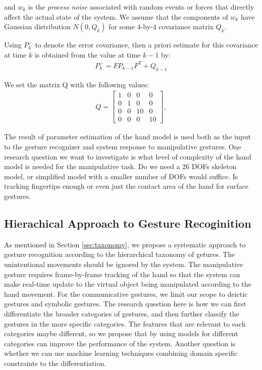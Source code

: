 and $w_k$ is the
\textit{process noise} associated with random events or forces that directly affect the actual state of the system. We assume that the components of $w_k$
have Gaussian distribution $N(0, Q_k)$ for some $4$-by-$4$ covariance matrix
$Q_k$.

Using $P_k^-$ to denote the error covariance, then a priori estimate for this
covariance at time $k$ is obtained from the value at time $k - 1$ by:
\begin{align*}
P_k^- = FP_{k - 1}F^T + Q_{k - 1}
\end{align*}

We set the matrix Q with the following values:
\begin{align*}
Q = \left[ \begin{array}{cccc}
	1 & 0 & 0 & 0 \\
	0 & 1 & 0 & 0 \\
	0 & 0 & 10 & 0 \\
	0 & 0 & 0 & 10 \end{array} \right],
\end{align*}
  
The result of parameter estimation of the hand model is used both as the input
to the gesture recognizer and system response to manipulative gestures. One
research question we want to investigate is what level of complexity of the
hand model is needed for the manipulative task. Do we need a 26 DOFs skeleton
model, or simplified model with a smaller number of DOFs would suffice. Is
tracking fingertips enough or even just the contact area of the hand for surface
gestures.

\subsection{Hierachical Approach to Gesture Recoginition}
As mentioned in Section \ref{sec:taxonomy}, we propose a systematic approach to
gesture recognition according to the hierarchical taxonomy of getures. The
unintentional movements should be ignored by the system. The manipulative
gesture requires frame-by-frame tracking of the hand so that the system can make
real-time update to the virtual object being manipulated according to the hand
movement. For the communicative gestures, we limit our scope to deictic gestures
and symbolic gestures. The research question here is how we can first
differentiate the broader categories of gestures, and then further classify the
gestures in the more specific categories. The features that are relevant to each
categories maybe different, so we propose that by using models for different
categories can improve the performance of the system. Another question is
whether we can use machine learning techniques combining domain specific
constraints to the differentiation.

